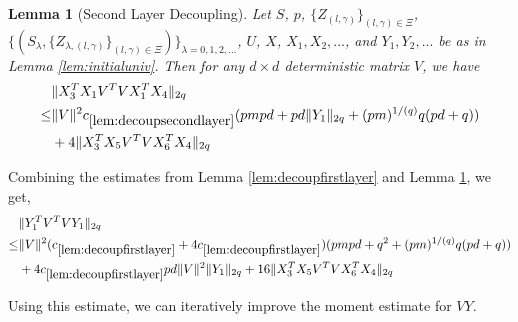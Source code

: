 \documentclass[11pt]{amsart}
\numberwithin{equation}{section}
\numberwithin{equation}{section}
\DeclarePairedDelimiter{\norm}{\lVert}{\rVert}
\newtheorem{lemma}[theorem]{Lemma}
\begin{document}
\begin{lemma}[Second Layer Decoupling]\label{lem:decoupsecondlayer}
Let $S$, $p$, $\{Z_{(l,\gamma)}\}_{(l,\gamma) \in \Xi}$, $\{(S_{\lambda},\{Z_{\lambda,(l,\gamma)}\}_{(l,\gamma) \in \Xi})\}_{\lambda=0,1,2,...}$, $U$, $X$, $X_1,X_2,...$, and $Y_1,Y_2,...$ be as in Lemma \ref{lem:initialuniv}.
Then for any $d \times d$ deterministic matrix $V$, we have
\begin{align*}
    &\norm{X_3^TX_1V^TVX_1^TX_4}_{2q} \\ \le&
    \norm{V}^2 c_{\ref{lem:decoupsecondlayer}}(pmpd+pd \norm{Y_1}_{2q}+(pm)^{1/(q)}q(pd+q))\\&+4\norm{X_3^TX_5V^TVX_6^TX_4}_{2q}
\end{align*}

\end{lemma}

Combining the estimates from Lemma \ref{lem:decoupfirstlayer} and Lemma \ref{lem:decoupsecondlayer}, we get,
\begin{align*}
    &\norm{Y_1^TV^TVY_1}_{2q} \\ \le&
    \norm{V}^2 (c_{\ref{lem:decoupfirstlayer}}+ 4c_{\ref{lem:decoupfirstlayer}})(pmpd+q^2+(pm)^{1/(q)}q(pd+q))\\&+4c_{\ref{lem:decoupfirstlayer}}pd\norm{V}^2\norm{Y_1}_{2q} +16\norm{X_3^TX_5V^TVX_6^TX_4}_{2q}
\end{align*}


Using this estimate, we can iteratively improve the moment estimate for $VY$.
\end{document}

